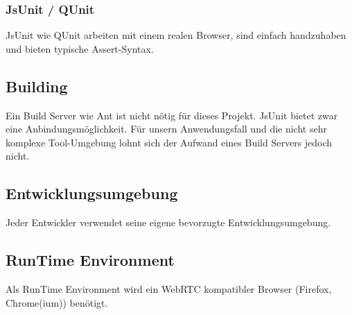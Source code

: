 \subsubsection{JsUnit / QUnit}
JsUnit wie QUnit arbeiten mit einem realen Browser, sind einfach handzuhaben und bieten typische Assert-Syntax.



\subsection{Building}
Ein Build Server wie Ant ist nicht nötig für dieses Projekt. JsUnit bietet zwar eine Anbindungsmöglichkeit. Für unsern Anwendungsfall und die nicht sehr komplexe Tool-Umgebung lohnt sich der Aufwand eines Build Servers jedoch nicht.


\subsection{Entwicklungsumgebung}
Jeder Entwickler verwendet seine eigene bevorzugte Entwicklungsumgebung.


\subsection{RunTime Environment}
Als RunTime Environment wird ein WebRTC kompatibler Browser (Firefox, Chrome(ium)) benötigt.


